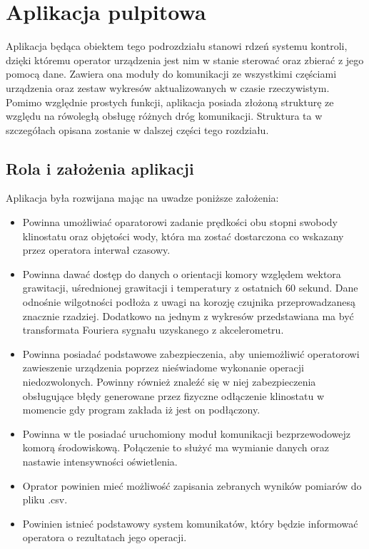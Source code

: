 \graphicspath{{./Aplikacja/images}}

\chapter{Aplikacja pulpitowa}

Aplikacja będąca obiektem tego podrozdziału stanowi rdzeń systemu kontroli, dzięki któremu operator urządzenia jest nim w stanie sterować oraz zbierać z jego pomocą dane. Zawiera ona moduły do komunikacji ze wszystkimi częściami urządzenia oraz zestaw wykresów aktualizowanych w czasie rzeczywistym. Pomimo względnie prostych funkcji, aplikacja posiada złożoną strukturę ze względu na rówoległą obsługę różnych dróg komunikacji. Struktura ta w szczegółach opisana zostanie  w dalszej części tego rozdziału.

\section{Rola i założenia aplikacji}

Aplikacja była rozwijana mając na uwadze poniższe założenia:
\begin{itemize}
	\item Powinna umożliwiać oparatorowi zadanie prędkości obu stopni swobody klinostatu oraz objętości wody, która ma zostać dostarczona co wskazany przez operatora interwał czasowy.
	\item Powinna dawać dostęp do danych o orientacji komory względem wektora grawitacji, uśrednionej grawitacji i temperatury z ostatnich 60 sekund. Dane odnośnie wilgotności podłoża z uwagi na korozję czujnika przeprowadzane\linebreak są znacznie rzadziej. Dodatkowo na jednym z wykresów przedstawiana ma być transformata Fouriera sygnału uzyskanego z akcelerometru.
	\item Powinna posiadać podstawowe zabezpieczenia, aby uniemożliwić operatorowi zawieszenie urządzenia poprzez nieświadome wykonanie operacji niedozwolonych. Powinny również znaleźć się w niej zabezpieczenia obsługujące błędy generowane przez fizyczne odłączenie klinostatu w momencie gdy program zakłada iż jest on podłączony.
	\item Powinna w tle posiadać uruchomiony moduł komunikacji bezprzewodowej\linebreak z komorą środowiskową. Połączenie to służyć ma wymianie danych oraz nastawie intensywności oświetlenia.
	\item Oprator powinien mieć możliwość zapisania zebranych wyników pomiarów do pliku .csv.
	\item Powinien istnieć podstawowy system komunikatów, który będzie informować operatora o rezultatach jego operacji.
\end{itemize}

